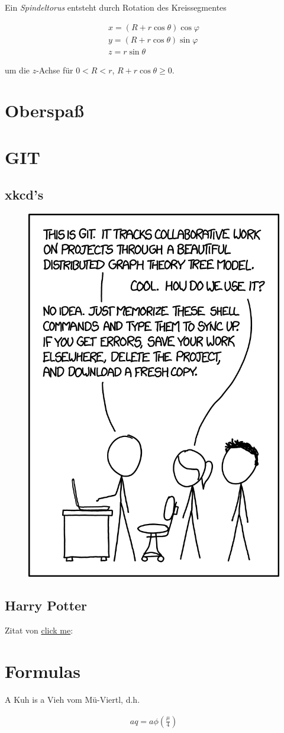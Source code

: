\documentclass{article}
\begin{document}
Ein \textit{Spindeltorus} entsteht durch Rotation des Kreissegmentes

\begin{align*}
  x = (R + r \cos{\theta}) \cos{\varphi} \\
  y = (R + r \cos{\theta}) \sin{\varphi} \\
  z = r \sin{\theta}
\end{align*}

um die $z$-Achse für $0 < R < r$, $R + r \cos{\theta} \geq 0$.

\section{Oberspaß}

\section{GIT}

\subsection{xkcd's}

\begin{figure}[h!]
  \centering
  \includegraphics[width = 0.5 \linewidth]{images/git_2x.png}
\end{figure}

\subsection{Harry Potter}

Zitat von 
\href{https://www.hp-lexicon.org/quote/professor-snape-ugly-git/}{click me}: \\


\section{Formulas}

A Kuh is a Vieh vom Mü-Viertl, d.h.

\begin{align}
  aq = a \phi \left( \frac{\mu}{4} \right)
\end{align}
\end{document}
